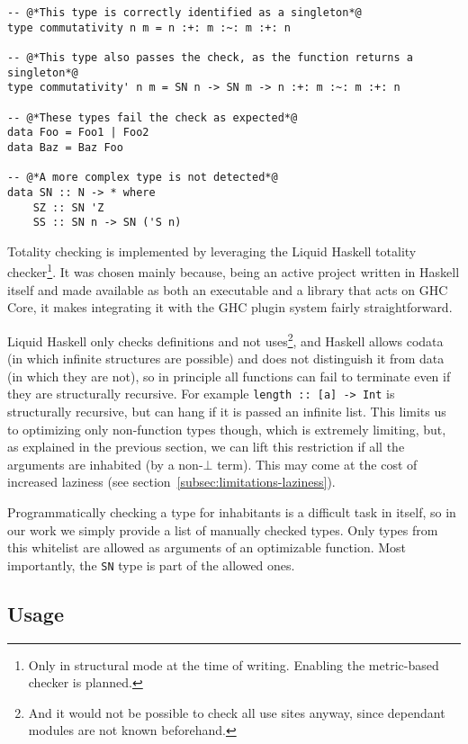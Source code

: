 \begin{lstlisting}[caption=Some examples of singleton detection]
-- @*This type is correctly identified as a singleton*@
type commutativity n m = n :+: m :~: m :+: n

-- @*This type also passes the check, as the function returns a singleton*@
type commutativity' n m = SN n -> SN m -> n :+: m :~: m :+: n

-- @*These types fail the check as expected*@
data Foo = Foo1 | Foo2
data Baz = Baz Foo

-- @*A more complex type is not detected*@
data SN :: N -> * where
    SZ :: SN 'Z
    SS :: SN n -> SN ('S n)
\end{lstlisting}

Totality checking is implemented by leveraging the Liquid Haskell\cite{refinement-types-for-haskell} totality checker\footnote{Only in structural mode at the time of writing. Enabling the metric-based checker is planned.}.
It was chosen mainly because, being an active project written in Haskell itself and made available as both an executable and a library that acts on GHC Core, it makes integrating it with the GHC plugin system fairly straightforward.

Liquid Haskell only checks definitions and not uses\footnote{And it would not be possible to check all use sites anyway, since dependant modules are not known beforehand.}, and Haskell allows codata (in which infinite structures are possible) and does not distinguish it from data (in which they are not), so in principle all functions can fail to terminate even if they are structurally recursive. For example \texttt{length :: [a] -> Int} is structurally recursive, but can hang if it is passed an infinite list.
This limits us to optimizing only non-function types though, which is extremely limiting, but, as explained in the previous section, we can lift this restriction if all the arguments are inhabited (by a non-$\bot$ term).
This may come at the cost of increased laziness (see section~\ref{subsec:limitations-laziness}).

Programmatically checking a type for inhabitants is a difficult task in itself, so in our work we simply provide a list of manually checked types.
Only types from this whitelist are allowed as arguments of an optimizable function.
Most importantly, the \texttt{SN} type is part of the allowed ones.

\subsection{Usage}
\label{subsec:usage}

